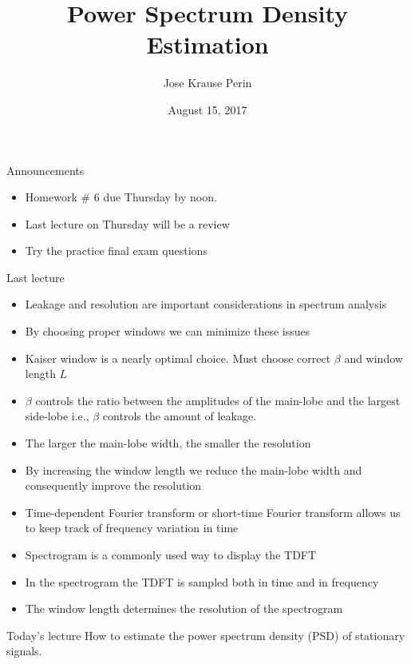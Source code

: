 \documentclass[10pt]{beamer}
\title[EE 264]{Power Spectrum Density Estimation}
\author{Jose Krause Perin}
\institute{Stanford University}
\date{August 15, 2017}
\begin{document}
\begin{frame}
  \titlepage
\end{frame}

%
\begin{frame}{Announcements}
\begin{itemize}
	\item Homework \# 6 due Thursday by noon.
	\item Last lecture on Thursday will be a review
	\item Try the practice final exam questions
\end{itemize}
\end{frame}

%
\begin{frame}{Last lecture}
\begin{itemize}
	\item Leakage and resolution are important considerations in spectrum analysis
	\item By choosing proper windows we can minimize these issues
	\item Kaiser window is a nearly optimal choice. Must choose correct $\beta$ and window length $L$
	\item $\beta$ controls the ratio between the amplitudes of the main-lobe and the largest side-lobe i.e., $\beta$ controls the amount of leakage.
	\item The larger the main-lobe width, the smaller the resolution
	\item By increasing the window length we reduce the main-lobe width and consequently improve the resolution
	\item Time-dependent Fourier transform or short-time Fourier transform allows us to keep track of frequency variation in time
	\item Spectrogram is a commonly used way to display the TDFT
	\item In the spectrogram the TDFT is sampled both in time and in frequency
	\item The window length determines the resolution of the spectrogram
\end{itemize}
\end{frame}

%
\begin{frame}{Today's lecture}
	How to estimate the power spectrum density (PSD) of stationary signals.
	\tableofcontents
\end{frame}
\end{document}

